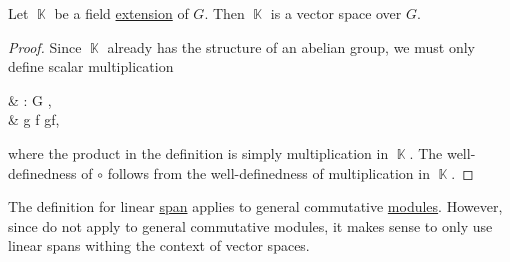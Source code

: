 \begin{proposition}\label{thm:field_extension_is_vector_space}
  Let \( \BbbK \) be a field \hyperref[def:field_extension]{extension} of \( G \). Then \( \BbbK \) is a vector space over \( G \).
\end{proposition}
\begin{proof}
  Since \( \BbbK \) already has the structure of an abelian group, we must only define scalar multiplication
  \begin{balign*}
     & \circ: G \times \BbbK \to \BbbK, \\
     & g \circ f \coloneqq gf,
  \end{balign*}
  where the product in the definition is simply multiplication in \( \BbbK \). The well-definedness of \( \circ \) follows from the well-definedness of multiplication in \( \BbbK \).
\end{proof}

\begin{remark}\label{rem:linear_span_only_for_vector_spaces}
  The definition for linear \hyperref[def:semimodule/submodel]{span} applies to general commutative \hyperref[def:module]{modules}. However, since  do not apply to general commutative modules, it makes sense to only use linear spans withing the context of vector spaces.
\end{remark}

